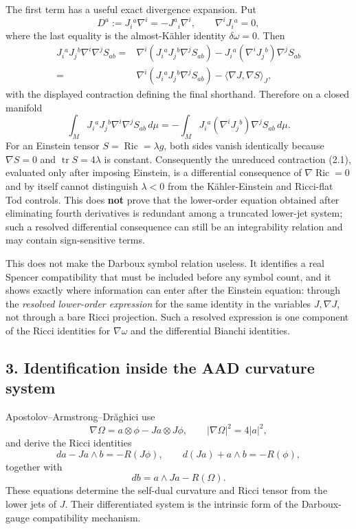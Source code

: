\documentclass[
  10pt,
]{report}
\begin{document}
The first term has a useful exact divergence expansion. Put \[
D^a:=J_i{}^a\nabla^i=-J^a{}_i\nabla^i,
\qquad \nabla^iJ_i{}^a=0,
\tag{2.2}
\] where the last equality is the almost-Kähler identity
\(\delta\omega=0\). Then \[
\begin{aligned}
J_i{}^aJ_j{}^b\nabla^i\nabla^jS_{ab}
={}&\nabla^i\!\left(J_i{}^aJ_j{}^b\nabla^jS_{ab}\right)
-J_i{}^a(\nabla^iJ_j{}^b)\nabla^jS_{ab} \\
={}&\nabla^i\!\left(J_i{}^aJ_j{}^b\nabla^jS_{ab}\right)
-\langle\nabla J,\nabla S\rangle_{J},
\end{aligned}
\tag{2.3}
\] with the displayed contraction defining the final shorthand.
Therefore on a closed manifold \[
\int_M J_i{}^aJ_j{}^b\nabla^i\nabla^jS_{ab}\,d\mu
=-\int_M J_i{}^a(\nabla^iJ_j{}^b)\nabla^jS_{ab}\,d\mu.
\tag{2.4}
\] For an Einstein tensor \(S=\operatorname{Ric}=\lambda g\), both sides
vanish identically because \(\nabla S=0\) and
\(\operatorname{tr}S=4\lambda\) is constant. Consequently the unreduced
contraction (2.1), evaluated only after imposing Einstein, is a
differential consequence of \(\nabla\operatorname{Ric}=0\) and by itself
cannot distinguish \(\lambda<0\) from the Kähler-Einstein and Ricci-flat
Tod controls. This does \textbf{not} prove that the lower-order equation
obtained after eliminating fourth derivatives is redundant among a
truncated lower-jet system; such a resolved differential consequence can
still be an integrability relation and may contain sign-sensitive terms.

This does not make the Darboux symbol relation useless. It identifies a
real Spencer compatibility that must be included before any symbol
count, and it shows exactly where information can enter after the
Einstein equation: through the \emph{resolved lower-order expression}
for the same identity in the variables \(J,\nabla J\), not through a
bare Ricci projection. Such a resolved expression is one component of
the Ricci identities for \(\nabla\omega\) and the differential Bianchi
identities.

\hypertarget{identification-inside-the-aad-curvature-system}{%
\subsection{3. Identification inside the AAD curvature
system}\label{identification-inside-the-aad-curvature-system}}

Apostolov--Armstrong--Drăghici use \[
\nabla\Omega=a\otimes\phi-Ja\otimes J\phi,
\qquad |\nabla\Omega|^2=4|a|^2,
\tag{3.1}
\] and derive the Ricci identities \[
da-Ja\wedge b=-R(J\phi),\qquad
d(Ja)+a\wedge b=-R(\phi),
\tag{3.2}
\] together with \[
db=a\wedge Ja-R(\Omega).
\tag{3.3}
\] These equations determine the self-dual curvature and Ricci tensor
from the lower jets of \(J\). Their differentiated system is the
intrinsic form of the Darboux-gauge compatibility mechanism.
\end{document}
